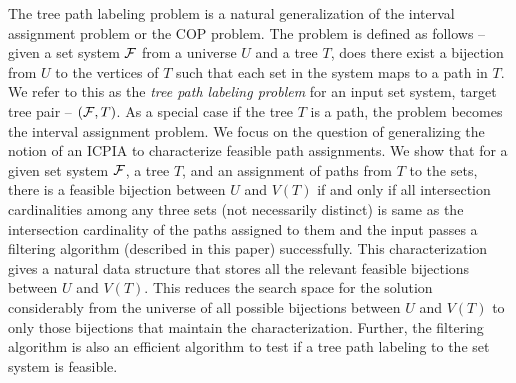 \documentclass[MS,synopsis]{iitmdiss}
\begin{document}
The tree path labeling problem is a natural generalization of the
interval assignment problem or the COP problem. The problem is defined
as follows -- given a set system ${\cal F}$ from a universe $U$ and a tree
$T$, does there exist a bijection from $U$ to the vertices of $T$ such
that each set in the system maps to a path in $T$.  We refer to this
as the {\em tree path labeling problem} for an input set system,
target tree pair -- $({\cal F},T)$. As a special case if the tree $T$ is a
path, the problem becomes the interval assignment problem.  We focus
on the question of generalizing the notion of an ICPIA \cite{nsnrs09}
to characterize feasible path assignments.  We show that for a given
set system ${\cal F}$, a tree $T$, and an assignment of paths from $T$ to
the sets, there is a feasible bijection between $U$ and $V(T)$ if and
only if all intersection cardinalities among any three sets (not
necessarily distinct) is same as the intersection cardinality of the
paths assigned to them and the input passes a filtering algorithm
(described in this paper) successfully.  This characterization gives a
natural data structure that stores all the relevant feasible
bijections between $U$ and $V(T)$. This reduces the search space for
the solution considerably from the universe of all possible bijections
between $U$ and $V(T)$ to only those bijections that maintain the
characterization.  Further, the filtering algorithm
is also an efficient algorithm to test if a tree path labeling to the
set system is
feasible.  %


\end{document}
